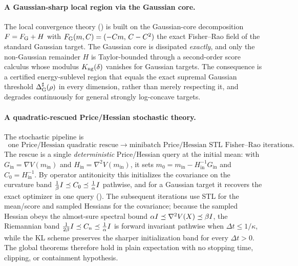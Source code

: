 \paragraph{A Gaussian-sharp local region via the Gaussian core.}
The local convergence theory () is built on the Gaussian-core decomposition
$F=F_{\mathrm G}+H$ with $F_{\mathrm G}(m,C)=(-Cm,\,C-C^2)$ the exact Fisher--Rao field of the standard
Gaussian target. The Gaussian core is dissipated \emph{exactly}, and only the non-Gaussian
remainder $H$ is Taylor-bounded through a second-order score calculus whose modulus $K_{\mathrm{ng}}(\delta)$
vanishes for Gaussian targets. The consequence is a certified energy-sublevel region that equals
the exact supremal Gaussian threshold $\Delta^{\sharp}_{\mathrm G}(\rho)$ in every dimension, rather than
merely respecting it, and degrades continuously for general strongly log-concave targets.

\paragraph{A quadratic-rescued Price/Hessian stochastic theory.}
The stochastic pipeline is
\[
    \boxed{\;
    \text{one Price/Hessian quadratic rescue}
    \;\longrightarrow\;
    \text{minibatch Price/Hessian STL Fisher--Rao iterations.}
    \;}
\]
The rescue is a single \emph{deterministic} Price/Hessian query at the initial mean: with
$G_{\mathrm{in}}=\nabla V(m_{\mathrm{in}})$ and $H_{\mathrm{in}}=\nabla^2V(m_{\mathrm{in}})$, it
sets $m_0=m_{\mathrm{in}}-H_{\mathrm{in}}^{-1}G_{\mathrm{in}}$ and $C_0=H_{\mathrm{in}}^{-1}$. By
operator antitonicity this initializes the covariance on the curvature band
$\tfrac1\beta I\preceq C_0\preceq\tfrac1\alpha I$ pathwise, and for a Gaussian target it recovers
the exact optimizer in one query (). The subsequent iterations use STL
for the mean/score and sampled Hessians for the covariance; because the sampled Hessian obeys the
almost-sure spectral bound $\alpha I\preceq\nabla^2V(X)\preceq\beta I$, the Riemannian band
$\tfrac1{2\beta}I\preceq C_n\preceq\tfrac1\alpha I$ is forward invariant pathwise when
$\Delta t\leq1/\kappa$, while the KL scheme preserves the sharper initialization band for every
$\Delta t>0$. The global theorems therefore hold in plain expectation with no stopping time, clipping,
or containment hypothesis.

